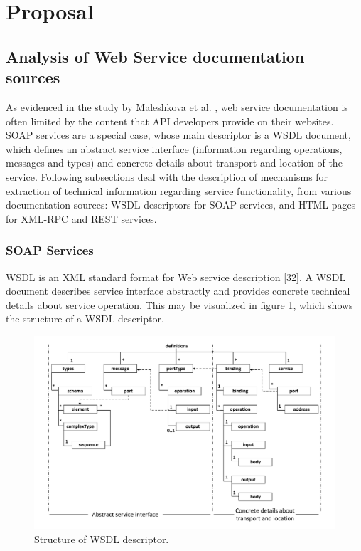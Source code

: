 \section{Proposal}
\label{proposal}

\subsection{Analysis of Web Service documentation sources}
\label{subsec:analysis-ws-doc}
As evidenced in the study by Maleshkova et al. \cite{Maleshkova:2010}, web service documentation is often limited by the content that API developers provide on their websites. SOAP services are a special case, whose main descriptor is a WSDL document, which defines an abstract service interface (information regarding operations, messages and types) and concrete details about transport and location of the service. Following subsections deal with the description of mechanisms for extraction of technical information regarding service functionality, from various documentation sources: WSDL descriptors for SOAP services, and HTML pages for XML-RPC and REST services.

\subsubsection{SOAP Services}
\label{subsub:soap}
WSDL is an XML standard format for Web service description [32]. A WSDL document describes service interface abstractly and provides concrete technical details about service operation. This may be visualized in figure \ref{wsdl-Structure}, which shows the structure of a WSDL descriptor.

\begin{figure}
\includegraphics[scale=0.40]{images/wsdl-structure-en}

\caption{Structure of WSDL descriptor.}
\label{wsdl-Structure}
\end{figure}

